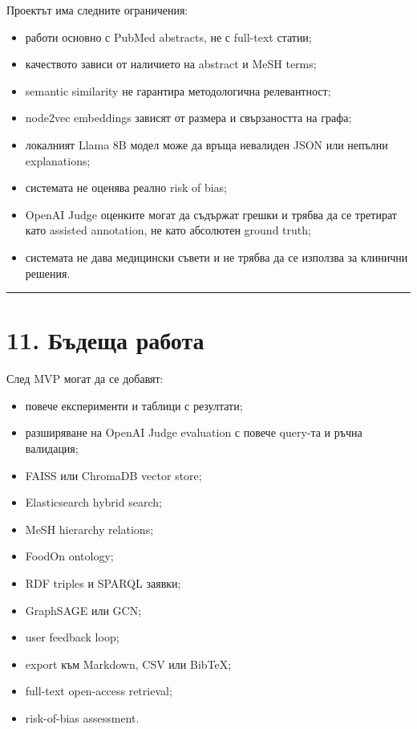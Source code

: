 \documentclass[12pt,a4paper]{article}
\providecommand{\tightlist}{\setlength{\itemsep}{0pt}\setlength{\parskip}{0pt}}
\begin{document}
Проектът има следните ограничения:

\begin{itemize}
\tightlist
\item
  работи основно с PubMed abstracts, не с full-text статии;
\item
  качеството зависи от наличието на abstract и MeSH terms;
\item
  semantic similarity не гарантира методологична релевантност;
\item
  node2vec embeddings зависят от размера и свързаността на графа;
\item
  локалният Llama 8B модел може да връща невалиден JSON или непълни explanations;
\item
  системата не оценява реално risk of bias;
\item
  OpenAI Judge оценките могат да съдържат грешки и трябва да се третират като assisted annotation, не като абсолютен ground truth;
\item
  системата не дава медицински съвети и не трябва да се използва за клинични решения.
\end{itemize}

\vspace{0.5em}\hrule\vspace{1.0em}

\section{11. Бъдеща работа}\label{ux431ux44aux434ux435ux449ux430-ux440ux430ux431ux43eux442ux430}

След MVP могат да се добавят:

\begin{itemize}
\tightlist
\item
  повече експерименти и таблици с резултати;
\item
  разширяване на OpenAI Judge evaluation с повече query-та и ръчна валидация;
\item
  FAISS или ChromaDB vector store;
\item
  Elasticsearch hybrid search;
\item
  MeSH hierarchy relations;
\item
  FoodOn ontology;
\item
  RDF triples и SPARQL заявки;
\item
  GraphSAGE или GCN;
\item
  user feedback loop;
\item
  export към Markdown, CSV или BibTeX;
\item
  full-text open-access retrieval;
\item
  risk-of-bias assessment.
\end{itemize}
\end{document}
